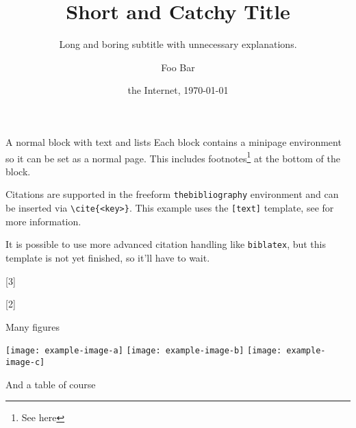 \documentclass[final]{beamer}
\title{Short and Catchy Title}
\subtitle{Long and boring subtitle with unnecessary explanations.}
\author[F. Bar]{Foo Bar}
\institute[Baz Inst.]{Baz Insititute}
\date{the Internet, \today}
\begin{document}
\begin{frame}[t]
\setlength{\columnsep}{0.02\textwidth}
\begin{multicols}{2}
  \begin{block}{A normal block with text and lists}
    Each block contains a minipage environment so it can be set as a normal page.
    This includes footnotes\footnote{See here} at the bottom of the block.

    Citations are supported in the freeform \texttt{thebibliography} environment
    and can be inserted via \texttt{\textbackslash{}cite\{<key>\}}. 
    This example uses the \texttt{[text]} template, see \cite{beamerhandbook} 
    for more information.

    It is possible to use more advanced citation handling like \texttt{biblatex},\cite{tex.sx}
    but this template is not yet finished, so it'll have to wait.

    \blindtext
    [3]

    [2]
  \end{block}
  
  \begin{block}{Many figures}
    \blindtext

    \begin{center}
      \texttt{[image: example-image-a]}\hspace{0.1\linewidth}
      \texttt{[image: example-image-b]}
      \texttt{[image: example-image-c]}
    \end{center}
  \end{block}

  \begin{block}{And a table of course}
    \blindtext


\end{block}
\end{multicols}
\end{frame}
\end{document}
